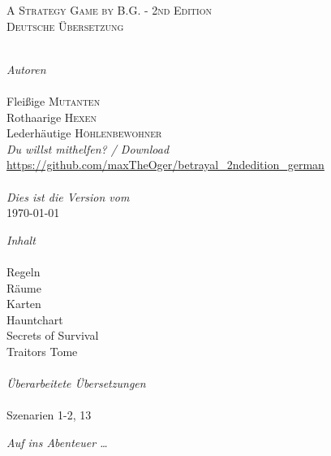 \begin{titlepage}
\begin{center}
\textsc{A Strategy Game by B.G. - 2nd Edition}\\[1.5cm]

\textsc{\Large Deutsche Übersetzung}\\[0.5cm]



\HRule \\[1.5cm]

\begin{minipage}{0.4\textwidth}
\begin{flushleft} \large
\emph{Autoren}\\
\\[0.3cm]
Fleißige \textsc{Mutanten}\\
Rothaarige \textsc{Hexen}\\
Lederhäutige \textsc{Höhlenbewohner}
\\[1.5cm]
\emph{Du willst mithelfen? / Download}
\\[0.3cm]
\url{https://github.com/maxTheOger/betrayal\_2ndedition\_german}\\
\\[1.5cm]
\emph{Dies ist die Version vom}
\\[0.3cm]
{\large \today}


\end{flushleft}
\end{minipage}
\hfill
\begin{minipage}{0.4\textwidth}
\begin{flushright} \large
\emph{Inhalt} \\
\\[0.3cm]
Regeln \\
Räume \\
Karten \\
Hauntchart \\
Secrets of Survival \\
Traitors Tome \\
\\[1.5cm]
\emph{Überarbeitete Übersetzungen}\\
\\[0.3cm]
Szenarien 1-2, 13
\end{flushright}
\end{minipage}

\vfill

{\emph{Auf ins Abenteuer …}}

\end{center}

\end{titlepage}
